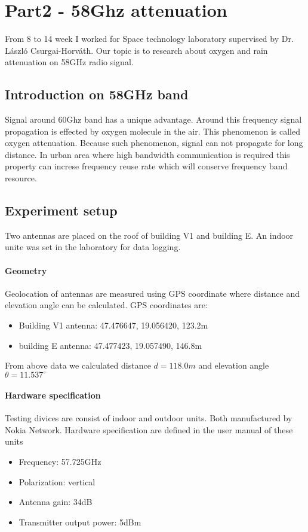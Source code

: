 \newpage

\section{Part2 - 58Ghz attenuation}
From 8 to 14 week I worked for Space technology laboratory supervised by Dr. László Csurgai-Horváth.
Our topic is to research about oxygen and rain attenuation on 58GHz radio signal.

\subsection{Introduction on 58GHz band}
Signal around 60Ghz band has a unique advantage. Around this frequency
signal propagation is effected by oxygen molecule in the air. This phenomenon is 
called oxygen attenuation. Because such phenomenon, signal can not propagate for long distance.
In urban area where high bandwidth communication is required this property can increse
frequency reuse rate which will conserve frequency band resource.

\subsection{Experiment setup}
Two antennas are placed on the roof of building V1 and building E.
An indoor unite was set in the laboratory for data logging.

\paragraph{Geometry}
Geolocation of antennas are measured using GPS coordinate where distance and
elevation angle can be calculated.
GPS coordinates are:
\begin{itemize}
    \item Building V1 antenna: 47.476647, 19.056420, 123.2m
    \item building E antenna: 47.477423, 19.057490, 146.8m
\end{itemize}

From above data we calculated distance $d = 118.0m$ 
and elevation angle $\theta = 11.537^\circ$

\paragraph{Hardware specification}
Testing divices are consist of indoor and outdoor units. Both manufactured by 
Nokia Network. Hardware specification are 
defined in the user manual of these units \cite{metrohopper}
\begin{itemize}
    \item Frequency: 57.725GHz
    \item Polarization: vertical
    \item Antenna gain: 34dB
    \item Transmitter output power: 5dBm
\end{itemize}

